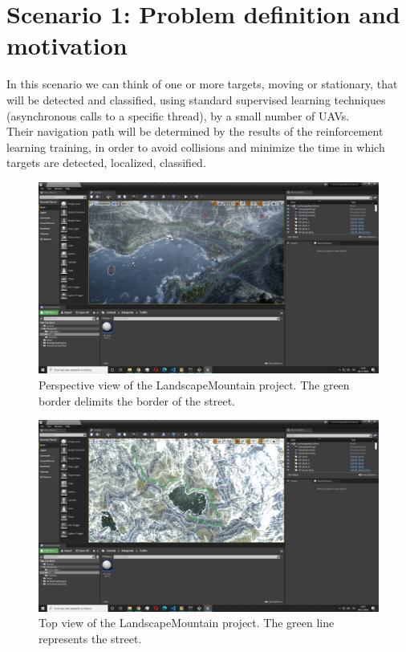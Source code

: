 \documentclass[LaM,binding=0.6cm]{sapthesis}
\begin{document}
\section*{Scenario 1: Problem definition and motivation}
In this scenario we can think of one or more targets, moving or stationary, that will be detected and classified, using standard supervised learning techniques (asynchronous calls to a specific thread), by a small number of UAVs. \\
Their navigation path will be determined by the results of the reinforcement learning training, in order to avoid collisions and minimize the time in which targets are detected, localized, classified.

\begin{figure}[hb!]
	\centering
	\includegraphics[width=1.0\columnwidth]{figures/Cattura6.PNG}
	\caption{Perspective view of the LandscapeMountain project. The green border delimits the border of the street.}
\end{figure}
\begin{figure}[!]
	\centering
	\includegraphics[width=1.0\columnwidth]{figures/Cattura7.PNG}
	\caption{Top view of the LandscapeMountain project. The green line represents the street.}
\end{figure}
\end{document}
